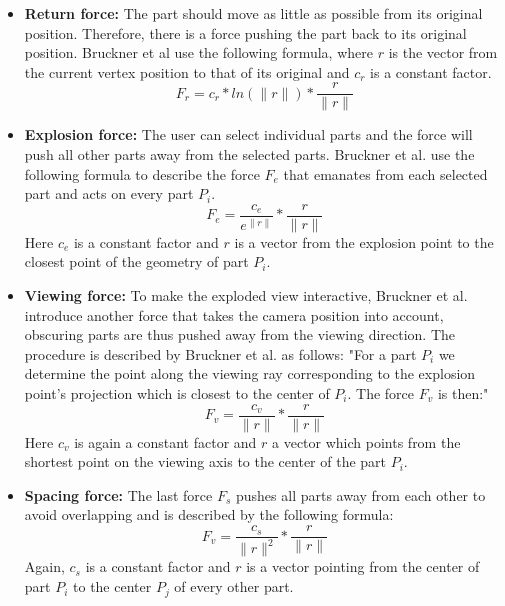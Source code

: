 \begin{itemize}
	\item \textbf{Return force:} The part should move as little as possible from its original position. Therefore, there is a force pushing the part back to its original position. Bruckner et al use the following formula, where $r$ is the vector from the current vertex position to that of its original and $c_r$ is a constant factor. 
	\begin{equation}
		F_r = c_r * ln(\|r\|) * \frac{r}{\|r\|}
		\label{eq:returnforce}
	\end{equation}
	
	\item \textbf{Explosion force:} The user can select individual parts and the force will push all other parts away from the selected parts. Bruckner et al. use the following formula to describe the force $F_e$ that emanates from each selected part and acts on every part $P_i$.
	\begin{equation}
		F_e = \frac{c_e}{e^{\|r\|}} * \frac{r}{\|r\|}
		\label{eq:explosionforce}
	\end{equation}
	Here $c_e$ is a constant factor and $r$ is a vector from the explosion point to the closest point of the geometry of part $P_i$.

	\item \textbf{Viewing force:} To make the exploded view interactive, Bruckner et al. introduce another force that takes the camera position into account, obscuring parts are thus pushed away from the viewing direction. The procedure is described by Bruckner et al. as follows: 
	"For a part $P_i$ we determine the point along the viewing ray corresponding to the explosion point’s projection which is closest to
	the center of $P_i$. The force $F_v$ is then:"
	\begin{equation}
		F_v = \frac{c_v}{\|r\|} * \frac{r}{\|r\|}
		\label{eq:viewingforce}
	\end{equation}
	Here $c_v$ is again a constant factor and $r$ a vector which points from the shortest point on the viewing axis to the center of the part $P_i$.  

	\item \textbf{Spacing force:} The last force $F_s$ pushes all parts away from each other to avoid overlapping and is described by the following formula:
	\begin{equation}
		F_v = \frac{c_s}{\|r\|^2} * \frac{r}{\|r\|}
		\label{eq:spacingforce}
	\end{equation}
	Again, $c_s$ is a constant factor and $r$ is a vector pointing from the center of part $P_i$ to the center $P_j$ of every other part.
\end{itemize}

